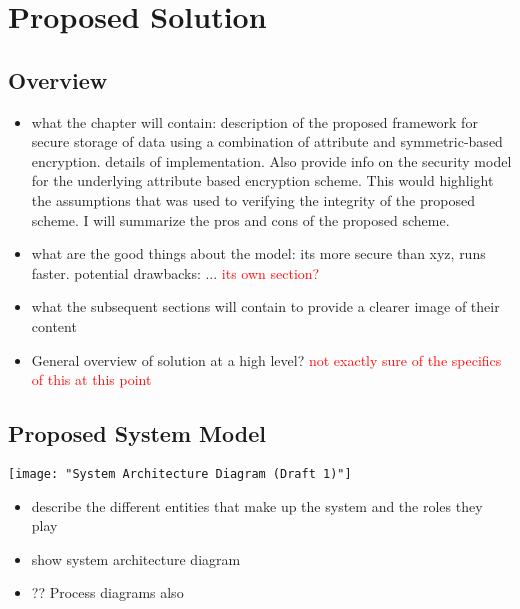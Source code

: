 \chapter{Proposed Solution}
\label{chap:proposed_solution}

\renewcommand{\theenumi}{\Alph{enumi}}
\renewcommand{\theenumii}{\roman{enumii}}

\section{Overview}

\begin{itemize}
	\item what the chapter will contain: description of the proposed framework for secure storage of data using a combination of attribute and symmetric-based encryption.  details of implementation. Also provide info on the security model for the underlying attribute based encryption scheme. This would highlight the assumptions that was used to verifying the integrity of the proposed scheme. I will summarize the pros and cons of the proposed scheme.
	
	\item what are the good things about the model: its more secure than xyz, runs faster. potential drawbacks: ... \textcolor{red}{its own section?}
	
	\item what the subsequent sections will contain to provide a clearer image of their content
\end{itemize}

\begin{itemize}
	\item General overview of solution at a high level? \textcolor{red}{not exactly sure of the specifics of this at this point}
\end{itemize}

\section{Proposed System Model}

\texttt{[image: "System Architecture Diagram (Draft 1)"]}

\begin{itemize}
	\item describe the different entities that make up the system and the roles they play
	\item show system architecture diagram
	\item ?? Process diagrams also
\end{itemize}



